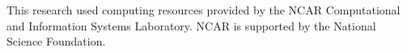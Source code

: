 \documentclass[linenumbers,draft]{agujournal}
\begin{document}
\acknowledgments

This research used computing resources provided by the NCAR Computational and Information Systems Laboratory.
NCAR is supported by the National Science Foundation.




\end{document}
